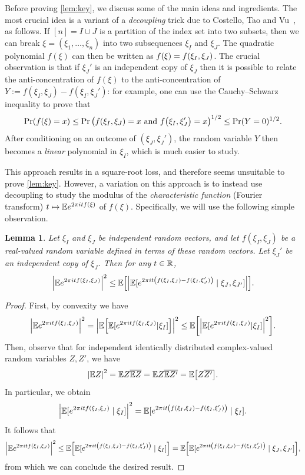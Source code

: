 \documentclass{daj}
\theoremstyle{plain}
\theoremstyle{plain}
\newtheorem{lem}[thm]{Lemma}
\theoremstyle{plain}
\theoremstyle{plain}
\theoremstyle{definition}
\theoremstyle{plain}
\theoremstyle{plain}
\theoremstyle{definition}
\theoremstyle{definition}
\theoremstyle{plain}
\let\originalleft\left
\let\originalright\right
\renewcommand{\left}{\mathopen{}\mathclose\bgroup\originalleft}
\renewcommand{\right}{\aftergroup\egroup\originalright}
\begin{document}
Before proving \cref{lem:key}, we discuss some of the main ideas and ingredients. The most crucial idea is a variant of a \emph{decoupling} trick due to Costello, Tao and Vu~\cite{CTV06}, as follows. If $[n]=I\cup J$ is a partition of the index set into two subsets, then we can break $\xi=(\xi_1,\dots,\xi_n)$ into two subsequences $\xi_{I}$ and $\xi_{J}$. The quadratic polynomial $f(\xi)$ can then be written as $f\left(\xi\right)=f\left(\xi_{I},\xi_{J}\right)$.
The crucial observation is that if $\xi_{J}'$ is an independent copy of $\xi_{J}$
then it is possible to relate the anti-concentration of $f(\xi)$
to the anti-concentration of $Y:=f(\xi_{I},\xi_{J})-f(\xi_{I},\xi_{J}')$:
for example, one can use the Cauchy--Schwarz inequality to prove
that \begin{equation}\Pr(f(\xi)=x)\le\Pr\big( f\left(\xi_{I},\xi_{J}\right)=x\text{ and }f\left(\xi_{I},\xi_{J}'\big)=x\right)^{1/2}\le \Pr(Y=0)^{1/2}.\label{eq:CTV}\end{equation}
After conditioning on an outcome of $(\xi_{J},\xi_{J}')$,
the random variable $Y$ then becomes a \emph{linear} polynomial in
$\xi_{I}$, which is much easier to study.

This approach results in a square-root loss, and therefore seems unsuitable to prove \cref{lem:key}. However, a variation on this approach is to instead
use decoupling to study the modulus of the \emph{characteristic function} (Fourier
transform) $t\mapsto \mathbb{E} e^{2\pi i t f(\xi)}$ of $f(\xi)$. Specifically, we will use the following
simple observation.

\begin{lem}
\label{lem:complex-decoupling}Let $\xi_I$ and $\xi_J$ be independent random vectors, and let $f(\xi_I,\xi_J)$ be a real-valued random variable defined in terms of these random vectors. Let $\xi_J'$ be an independent copy of $\xi_J$. Then for any $t\in \mathbb{R}$,
$$
\left|\E e^{2\pi itf(\xi_I,\xi_J)}\right|^{2}  \le \E\left[\left|\E[e^{2\pi it\left(f(\xi_{I},\xi_{J})-f(\xi_{I},\xi_{J}')\right)}\mid \xi_{J},\xi_{J'}]\right|\right].
$$
\end{lem}

\begin{proof}
First, by convexity we have
$$
\left|\E e^{2\pi itf(\xi_I,\xi_J)}\right|^{2} = \left|\E\left[\E [e^{2\pi itf(\xi_I,\xi_J)} | \xi_{I}]\right]\right|^{2} \le\E\left[\left|\E[e^{2\pi it f\left(\xi_{I},\xi_{J}\right)} | \xi_{I}]\right|^{2}\right].
$$
Then, observe that for independent identically distributed complex-valued random variables $Z,Z'$, we have 
$$
\left|\E Z\right|^{2}=\E Z\overline{\E Z}=\E Z\overline{\E Z'}=\E\left[Z\overline{Z'}\right].
$$
In particular, we obtain
$$
\left|\E[e^{2\pi it f\left(\xi_{I},\xi_{J}\right)}\mid \xi_{I}]\right|^{2}=\E[e^{2\pi it\left(f(\xi_{I},\xi_{J})-f(\xi_{I},\xi_{J}')\right)}\mid\xi_{I}].
$$
It follows that
$$
\left|\E e^{2\pi itf(\xi_I,\xi_J)}\right|^{2} \le \E\left[\E[e^{2\pi it\left(f(\xi_{I},\xi_{J})-f(\xi_{I},\xi_{J}')\right)}\mid\xi_{I}]\right]
 =\E\left[\E[e^{2\pi it\left(f(\xi_{I},\xi_{J})-f(\xi_{I},\xi_{J}')\right)}\mid\xi_{J},\xi_{J'}]\right],
$$
from which we can conclude the desired result.
\end{proof}
\end{document}
